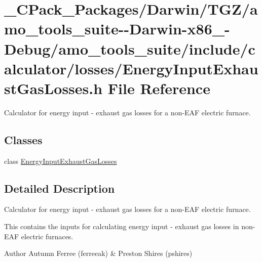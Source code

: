 \hypertarget{___c_pack___packages_2_darwin_2_t_g_z_2amo__tools__suite--_darwin-x86__64-_debug_2amo__tools__su85291952197019717b84686254e991e7}{}\section{\+\_\+\+C\+Pack\+\_\+\+Packages/\+Darwin/\+T\+G\+Z/amo\+\_\+tools\+\_\+suite-\/-\/\+Darwin-\/x86\+\_-\/\+Debug/amo\+\_\+tools\+\_\+suite/include/calculator/losses/\+Energy\+Input\+Exhaust\+Gas\+Losses.h File Reference}
\label{___c_pack___packages_2_darwin_2_t_g_z_2amo__tools__suite--_darwin-x86__64-_debug_2amo__tools__su85291952197019717b84686254e991e7}


Calculator for energy input -\/ exhaust gas losses for a non-\/\+E\+AF electric furnace.  


\subsection*{Classes}
\begin{DoxyCompactItemize}
\item 
class \hyperlink{class_energy_input_exhaust_gas_losses}{Energy\+Input\+Exhaust\+Gas\+Losses}
\end{DoxyCompactItemize}


\subsection{Detailed Description}
Calculator for energy input -\/ exhaust gas losses for a non-\/\+E\+AF electric furnace. 

This contains the inputs for calculating energy input -\/ exhaust gas losses in non-\/\+E\+AF electric furnaces.

\begin{DoxyAuthor}{Author}
Autumn Ferree (ferreeak) \& Preston Shires (pshires) 
\end{DoxyAuthor}
